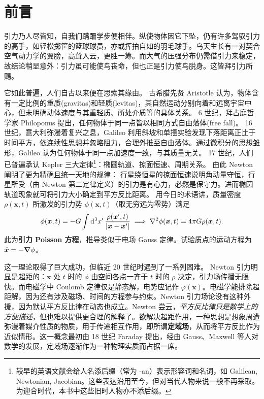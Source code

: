 \chapter*{前言}

引力乃人尽皆知，自我们蹒跚学步便相伴。纵使物体因它下坠，仍有许多驾驭引力的高手，如轻松掷筐的篮球球员，亦或挥拍自如的羽毛球手。鸟天生长有一对契合空气动力学的翼膀，高耸入云，更胜一筹。而大气的压强分布仍需借引力来稳定，故结论稍显意外：引力虽可能使鸟丧命，但也正是引力使鸟脱身。这皆拜引力所赐。

它如此普遍，人们自古以来便在思索其缘由。
古希腊先贤 Aristotle 认为，物体含有一定比例的重质(gravitas)和轻质(levitas)，其自然运动分别向着和远离宇宙中心，但未明确动体速度与其重轻质、所处介质等的具体关系。
6 世纪，拜占庭哲学家 Philoponus 提出，任何物体于同一点皆以相同方式自由落体(free fall)。
16 世纪，意大利弥漫着复兴之息，Galileo 利用斜坡和单摆实验发现下落距离正比于时间平方，依连续性思想并忽略阻力，合理外推至自由落体。通过微积分的思想雏形，Galileo 认为任何物体于同一点加速度一致，与其质量无关。
17 世纪，人们已普遍承认 Kepler 三大定律\footnote{较早的英语文献会给人名添后缀（常为 -an）表示形容词和名词，如 Galilean, Newtonian, Jacobian。这些表达沿用至今，但对当代人物来说一般不再采取。为迎合时代，本书中这些旧时人物亦不添后缀。}：椭圆轨道、掠面恒速、周期关系。
由此 Newton 阐明了更为精确且统一天地的规律：
行星绕恒星的掠面恒速说明角动量守恒，行星所受（由 Newton 第二定律定义）的引力是有心力，必然是保守力。进而椭圆轨道现象就可将引力大小确定到平方反比距离。
用今日的术语讲，质量密度 $\rho(\bm x,t)$ 所激发的引力势 $\phi(\bm x,t)$（取无穷远为零势）满足
\[\phi(\bm x,t)=-G\int\dd[3]{x'}\frac{\rho(\bm x',t)}{|\bm x-\bm x'|}\implies \nabla^2\phi(\bm x,t)=4\pi G \rho(\bm x,t).\]
此为\textbf{引力 Poisson 方程}，推导类似于电场 Gauss 定律。试验质点的运动方程为 $\ddot{\bm x}=-\grad\phi$。

这一理论取得了巨大成功，但临近 20 世纪时遇到了一系列困难。
Newton 引力明显是超距的：$\bm x$ 处 $t$ 时的 $\phi$ 由空间各点一齐于 $t$ 时的 $\rho$ 决定，引力场传播无限快。而电磁学中 Coulomb 定律仅是静态解，电势应记作 $\varphi(\bm x)$。电磁学能排除超距解，因为还有涉及磁场、时间的方程参与约束。Newton 引力场论没有这种外援，因为默认平方反比律在动态也成立。Newton 尝云，\emph{平方反比律只是数学上的方便描述}，但也难以提供更合理的解释了。欲解决超距作用，一种思想是想象周遭弥漫着媒介性质的物质，用于传递相互作用，即所谓\textbf{定域场}，从而将平方反比作为近似情形。这一概念最初由 18 世纪 Faraday 提出，经由 Gauss、Maxwell 等人对数学的发展，定域场逐渐作为一种物理实质而占据一席。

